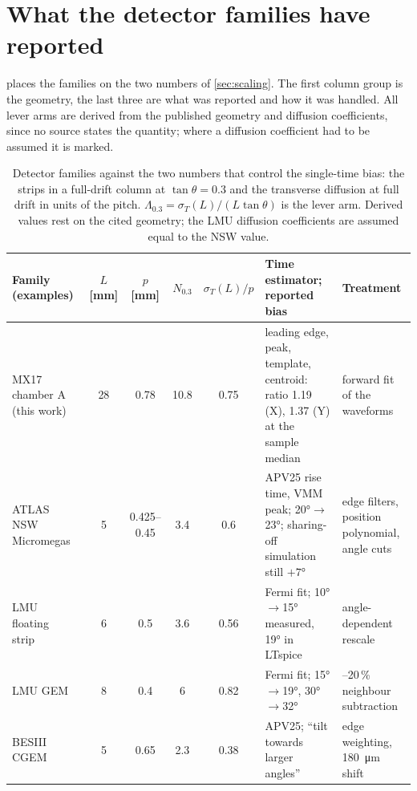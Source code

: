 \section{What the detector families have reported}\label{sec:literature}

 places the families on the two numbers of \cref{sec:scaling}. The first column group is the geometry, the
last three are what was reported and how it was handled. All lever arms are derived from the published geometry and
diffusion coefficients, since no source states the quantity; where a diffusion coefficient had to be assumed it is marked.

\begin{table}[t]
  \centering\footnotesize
  \caption{Detector families against the two numbers that control the single-time bias: the strips in a full-drift column at
  $\tan\theta = 0.3$ and the transverse diffusion at full drift in units of the pitch. $\Lambda_{0.3} = \sigma_T(L)/(L\tan\theta)$
  is the lever arm. Derived values rest on the cited geometry; the LMU diffusion coefficients are assumed equal to the NSW value.}
  \label{tab:families}
  \begin{tabular}{@{}p{3.1cm}cccc>{\raggedright\arraybackslash}p{3.0cm}>{\raggedright\arraybackslash}p{2.9cm}@{}}
    \toprule
    Family (examples) & $L$ [mm] & $p$ [mm] & $N_{0.3}$ & $\sigma_T(L)/p$ & Time estimator; reported bias & Treatment \\
    \midrule
    MX17 chamber A (this work) & 28 & 0.78 & 10.8 & 0.75 & leading edge, peak, template, centroid: ratio 1.19 (X), 1.37 (Y) at the sample median & forward fit of the waveforms \\
    ATLAS NSW Micromegas~\cite{Iodice2015,Ntekas2016,Scholer2021} & 5 & 0.425--0.45 & 3.4 & 0.6 & APV25 rise time, VMM peak; \ang{20}$\to$\ang{23}; sharing-off simulation still $+\ang{7}$ & edge filters, position polynomial, angle cuts \\
    LMU floating strip~\cite{Bortfeldt2014,Bortfeldt2015} & 6 & 0.5 & 3.6 & 0.56 & Fermi fit; \ang{10}$\to$\ang{15} measured, \ang{19} in LTspice & angle-dependent rescale \\
    LMU GEM~\cite{Flierl2018} & 8 & 0.4 & 6 & 0.82 & Fermi fit; \ang{15}$\to$\ang{19}, \ang{30}$\to$\ang{32} & 15--20\,\% neighbour subtraction \\
    BESIII CGEM~\cite{Alexeev2019,Farinelli2019} & 5 & 0.65 & 2.3 & 0.38 & APV25; ``tilt towards larger angles'' & edge weighting, \SI{180}{\micro\metre} shift \\

\end{tabular}
\end{table}
